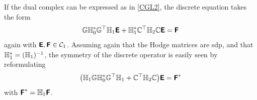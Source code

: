 \documentclass[11pt]{article}
\begin{document}
If the dual complex can be expressed as in \eqref{CGL2}, the discrete equation 
takes the form
\begin{equation} \label{HL2}
	\mathbb{G} \mathbb{H}^*_0 \mathbb{G}^\top \mathbb{H}_1 {\boldsymbol {\rm \mathsf{E}}} + \mathbb{H}^*_1 \mathbb{C}^\top \mathbb{H}_2 \mathbb{C} {\boldsymbol {\rm \mathsf{E}}} 
		= {\boldsymbol {\rm \mathsf{F}}}
\end{equation}
again with ${\boldsymbol {\rm \mathsf{E}}}, {\boldsymbol {\rm \mathsf{F}}} \in \mathcal{C}_1$.
Assuming again that the Hodge matrices are sdp, and that
$\mathbb{H}^*_1 = (\mathbb{H}_1)^{-1}$, the symmetry of the discrete operator
is easily seen by reformulating
\begin{equation} \label{HL3}
	\big(\mathbb{H}_1 \mathbb{G} \mathbb{H}^*_0 \mathbb{G}^\top \mathbb{H}_1 + \mathbb{C}^\top \mathbb{H}_2 \mathbb{C}\big) {\boldsymbol {\rm \mathsf{E}}} 
		= {\boldsymbol {\rm \mathsf{F}}}^*
\end{equation}
with ${\boldsymbol {\rm \mathsf{F}}}^* = \mathbb{H}_1 {\boldsymbol {\rm \mathsf{F}}}$.



\end{document}
